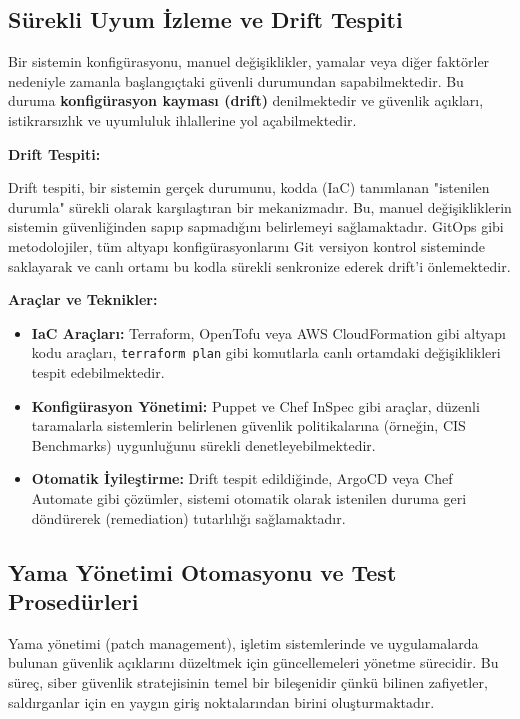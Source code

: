 \subsection{Sürekli Uyum İzleme ve Drift Tespiti}

Bir sistemin konfigürasyonu, manuel değişiklikler, yamalar veya diğer faktörler nedeniyle zamanla başlangıçtaki güvenli durumundan sapabilmektedir. Bu duruma \textbf{konfigürasyon kayması (drift)} denilmektedir ve güvenlik açıkları, istikrarsızlık ve uyumluluk ihlallerine yol açabilmektedir.

\textbf{Drift Tespiti:}

Drift tespiti, bir sistemin gerçek durumunu, kodda (IaC) tanımlanan "istenilen durumla" sürekli olarak karşılaştıran bir mekanizmadır. Bu, manuel değişikliklerin sistemin güvenliğinden sapıp sapmadığını belirlemeyi sağlamaktadır. GitOps gibi metodolojiler, tüm altyapı konfigürasyonlarını Git versiyon kontrol sisteminde saklayarak ve canlı ortamı bu kodla sürekli senkronize ederek drift'i önlemektedir.

\textbf{Araçlar ve Teknikler:}
\begin{itemize}
    \item \textbf{IaC Araçları:} Terraform, OpenTofu veya AWS CloudFormation gibi altyapı kodu araçları, \texttt{terraform plan} gibi komutlarla canlı ortamdaki değişiklikleri tespit edebilmektedir.
    \item \textbf{Konfigürasyon Yönetimi:} Puppet ve Chef InSpec gibi araçlar, düzenli taramalarla sistemlerin belirlenen güvenlik politikalarına (örneğin, CIS Benchmarks) uygunluğunu sürekli denetleyebilmektedir.
    \item \textbf{Otomatik İyileştirme:} Drift tespit edildiğinde, ArgoCD veya Chef Automate gibi çözümler, sistemi otomatik olarak istenilen duruma geri döndürerek (remediation) tutarlılığı sağlamaktadır.
\end{itemize}

\subsection{Yama Yönetimi Otomasyonu ve Test Prosedürleri}

Yama yönetimi (patch management), işletim sistemlerinde ve uygulamalarda bulunan güvenlik açıklarını düzeltmek için güncellemeleri yönetme sürecidir. Bu süreç, siber güvenlik stratejisinin temel bir bileşenidir çünkü bilinen zafiyetler, saldırganlar için en yaygın giriş noktalarından birini oluşturmaktadır.

